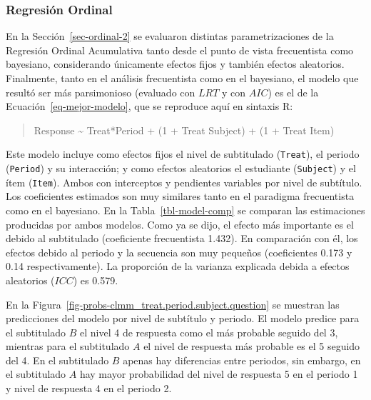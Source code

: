 \documentclass[
  12pt,
  a4paper,
  extrafontsizes,
  onecolumn,
  openright,
  table]{memoir}
\begin{document}
\normalsize

\hypertarget{sec-ordinal-3}{%
\subsubsection{Regresión Ordinal}\label{sec-ordinal-3}}

En la Sección~\ref{sec-ordinal-2} se evaluaron distintas
parametrizaciones de la Regresión Ordinal Acumulativa tanto desde el
punto de vista frecuentista como bayesiano, considerando únicamente
efectos fijos y también efectos aleatorios. Finalmente, tanto en el
análisis frecuentista como en el bayesiano, el modelo que resultó ser
más parsimonioso (evaluado con \(LRT\) y con \(AIC\)) es el de la
Ecuación~\ref{eq-mejor-modelo}, que se reproduce aquí en sintaxis R:

\small

\begin{quote}
Response \textasciitilde{} Treat*Period + (1 + Treat \textbar{} Subject)
+ (1 + Treat \textbar{} Item)
\end{quote}

\normalsize

Este modelo incluye como efectos fijos el nivel de subtitulado
(\texttt{Treat}), el periodo (\texttt{Period}) y su interacción; y como
efectos aleatorios el estudiante (\texttt{Subject}) y el ítem
(\texttt{Item}). Ambos con interceptos y pendientes variables por nivel
de subtítulo. Los coeficientes estimados son muy similares tanto en el
paradigma frecuentista como en el bayesiano. En la
Tabla~\ref{tbl-model-comp} se comparan las estimaciones producidas por
ambos modelos. Como ya se dijo, el efecto más importante es el debido al
subtitulado (coeficiente frecuentista 1.432). En comparación con él, los
efectos debido al periodo y la secuencia son muy pequeños (coeficientes
0.173 y 0.14 respectivamente). La proporción de la varianza explicada
debida a efectos aleatorios (\(ICC\)) es 0.579.

En la Figura~\ref{fig-probs-clmm_treat.period.subject.question} se
muestran las predicciones del modelo por nivel de subtítulo y periodo.
El modelo predice para el subtitulado \(B\) el nivel 4 de respuesta como
el más probable seguido del 3, mientras para el subtitulado \(A\) el
nivel de respuesta más probable es el 5 seguido del 4. En el subtitulado
\(B\) apenas hay diferencias entre periodos, sin embargo, en el
subtitulado \(A\) hay mayor probabilidad del nivel de respuesta 5 en el
periodo 1 y nivel de respuesta 4 en el periodo 2.
\end{document}
